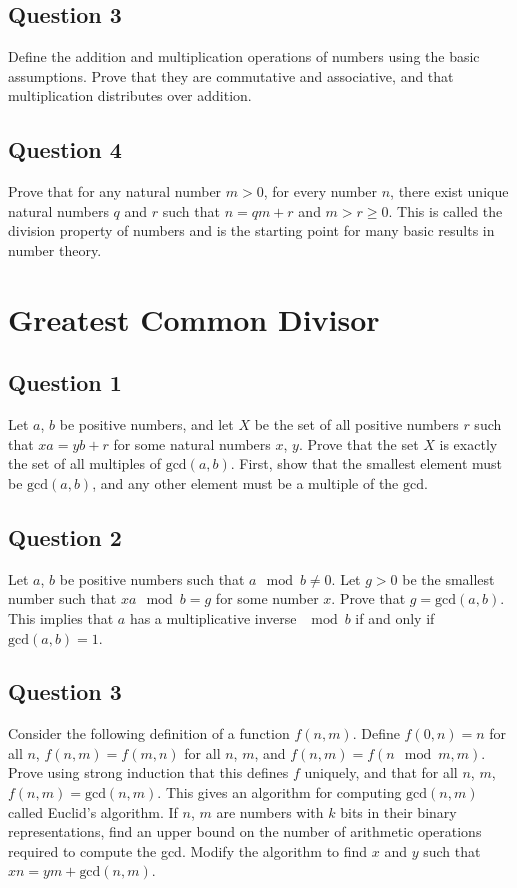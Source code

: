 \documentclass[12pt]{report}
\begin{document}
\section*{Question 3}
Define the addition and multiplication operations of numbers using the basic assumptions. Prove that they are commutative and associative, and that multiplication distributes over addition.

\section*{Question 4}
Prove that for any natural number $m > 0$, for every number $n$, there exist unique natural numbers $q$ and $r$ such that $n = qm + r$ and $m > r \geq 0$. This is called the division property of numbers and is the starting point for many basic results in number theory.

\chapter{Greatest Common Divisor}
\section*{Question 1}
Let $a$, $b$ be positive numbers, and let $X$ be the set of all positive numbers $r$ such that $xa = yb + r$ for some natural numbers $x$, $y$. Prove that the set $X$ is exactly the set of all multiples of $\text{gcd}(a, b)$. First, show that the smallest element must be $\text{gcd}(a, b)$, and any other element must be a multiple of the $\text{gcd}$.

\section*{Question 2}
Let $a$, $b$ be positive numbers such that $a \mod b \neq 0$. Let $g > 0$ be the smallest number such that $xa \mod b = g$ for some number $x$. Prove that $g = \text{gcd}(a, b)$. This implies that $a$ has a multiplicative inverse $\mod b$ if and only if $\text{gcd}(a, b) = 1$.

\section*{Question 3}
Consider the following definition of a function $f(n, m)$. Define $f(0, n) = n$ for all $n$, $f(n, m) = f(m, n)$ for all $n$, $m$, and $f(n, m) = f(n \mod m, m)$. Prove using strong induction that this defines $f$ uniquely, and that for all $n$, $m$, $f(n, m) = \text{gcd}(n, m)$. This gives an algorithm for computing $\text{gcd}(n, m)$ called Euclid’s algorithm. If $n$, $m$ are numbers with $k$ bits in their binary representations, find an upper bound on the number of arithmetic operations required to compute the gcd. Modify the algorithm to find $x$ and $y$ such that $xn = ym + \text{gcd}(n, m)$.
\end{document}
